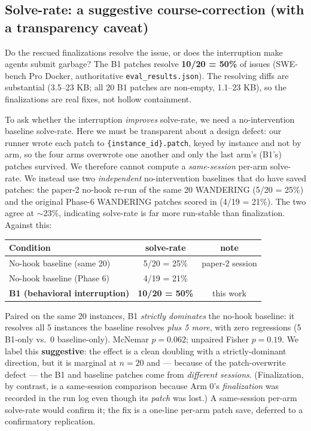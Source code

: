 \documentclass[11pt]{article}
\begin{document}
\subsection{Solve-rate: a suggestive course-correction (with a transparency caveat)}

Do the rescued finalizations resolve the issue, or does the interruption make agents submit garbage? The B1 patches resolve \textbf{10/20 = 50\%} of issues (SWE-bench Pro Docker, authoritative \texttt{eval\_results.json}). The resolving diffs are substantial (3.5--23 KB; all 20 B1 patches are non-empty, 1.1--23 KB), so the finalizations are real fixes, not hollow containment.

To ask whether the interruption \emph{improves} solve-rate, we need a no-intervention baseline solve-rate. Here we must be transparent about a design defect: our runner wrote each patch to \texttt{\{instance\_id\}.patch}, keyed by instance and not by arm, so the four arms overwrote one another and only the last arm's (B1's) patches survived. We therefore cannot compute a \emph{same-session} per-arm solve-rate. We instead use two \emph{independent} no-intervention baselines that do have saved patches: the paper-2 no-hook re-run of the same 20 WANDERING (5/20 = 25\%) and the original Phase-6 WANDERING patches scored in \cite{residual_nulls} (4/19 = 21\%). The two agree at $\sim$23\%, indicating solve-rate is far more run-stable than finalization. Against this:

\begin{center}
\begin{tabular}{lcc}
\toprule
Condition & solve-rate & note \\
\midrule
No-hook baseline (same 20) & 5/20 = 25\% & paper-2 session \\
No-hook baseline (Phase 6) & 4/19 = 21\% & \cite{residual_nulls} \\
\textbf{B1 (behavioral interruption)} & \textbf{10/20 = 50\%} & this work \\
\bottomrule
\end{tabular}
\end{center}

Paired on the same 20 instances, B1 \emph{strictly dominates} the no-hook baseline: it resolves all 5 instances the baseline resolves \emph{plus 5 more}, with zero regressions (5 B1-only vs.\ 0 baseline-only). McNemar $p=0.062$; unpaired Fisher $p=0.19$. We label this \textbf{suggestive}: the effect is a clean doubling with a strictly-dominant direction, but it is marginal at $n{=}20$ and --- because of the patch-overwrite defect --- the B1 and baseline patches come from \emph{different sessions}. (Finalization, by contrast, is a same-session comparison because Arm 0's \emph{finalization} was recorded in the run log even though its \emph{patch} was lost.) A same-session per-arm solve-rate would confirm it; the fix is a one-line per-arm patch save, deferred to a confirmatory replication.
\end{document}
